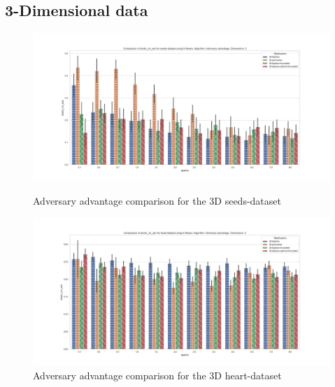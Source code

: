 \subsection{3-Dimensional data}
\begin{figure}[H]
    \centering
    \begin{minipage}[c]{0.8\textwidth}
        \includegraphics[width=1\textwidth]{Results/RQ2/seeds-dataset/shokri_mi_adv_seeds-dataset_comparison.png}
        \caption{Adversary advantage comparison for the 3D seeds-dataset}
        \label{fig:appendix-mi_seeds-dataset_comparison_3 d}
    \end{minipage}
    \begin{minipage}[c]{0.8\textwidth}
        \includegraphics[width=1\textwidth]{Results/RQ2/heart-dataset/shokri_mi_adv_heart-dataset_comparison.png}
        \caption{Adversary advantage comparison for the 3D heart-dataset}
        \label{fig:appendix-mi_heart-dataset_comparison_3d}
    \end{minipage}

\end{figure}

